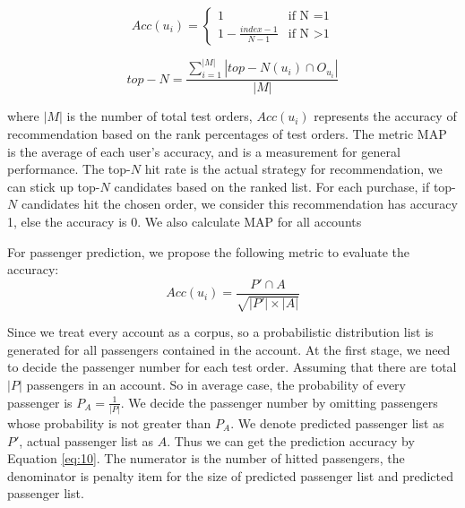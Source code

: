 \documentclass{llncs}
\begin{document}
\begin{equation}
Acc(u_i) =
\begin{cases}
1 & \mbox{if N =1}\\
1 - \frac{index-1}{N-1} & \mbox{if N >1}
\end{cases}
\end{equation}

\begin{equation}
top-N = \frac{\sum_{i=1}^{|M|}|top-N(u_i) \cap O_{u_i}|}{|M|}
\end{equation}

where $|M|$ is the number of total test orders, $Acc(u_i)$ represents the accuracy of recommendation based on the rank percentages of test orders. The metric MAP is the average of each user's accuracy, and is a measurement for general performance. The top-$N$ hit rate is the actual strategy for recommendation, we can stick up top-$N$ candidates based on the ranked list. For each purchase, if top-$N$ candidates hit the chosen order, we consider this recommendation has accuracy 1, else the accuracy is 0. We also calculate MAP for all accounts \par
For passenger prediction, we propose the following metric to evaluate the accuracy:\\
\begin{equation}
\label{eq:10}
Acc(u_i) = \frac{P' \cap A}{\sqrt{|P'| \times |A|}}
\end{equation}\par
Since we treat every account as a corpus, so a probabilistic distribution list is generated for all passengers contained in the account. At the first stage, we need to decide the passenger number for each test order. Assuming that there are total $|P|$ passengers in an account. So in average case, the probability of every passenger is $P_A = \frac{1}{|P|}$. We decide the passenger number by omitting passengers whose probability is not greater than $P_A$. We denote predicted passenger list as $P'$, actual passenger list as $A$. Thus we can get the prediction accuracy by Equation \ref{eq:10}. The numerator is the number of hitted passengers, the denominator is penalty item for the size of predicted passenger list and predicted passenger list.
\end{document}
